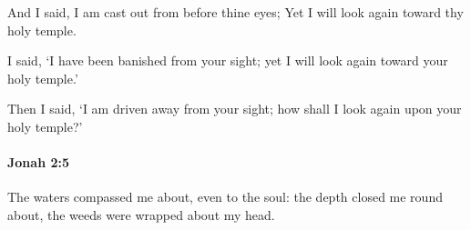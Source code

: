 			\begin{versebox}
					\item[BHS] 
					\item[LXX] 
					\item[ASV] And I said, I am cast out from before thine eyes; Yet I will look again toward thy holy temple.
					\item[NIV] I said, ‘I have been banished from your sight; yet I will look again toward your holy temple.’
					\item[NRSV] Then I said, ‘I am driven away from your sight; how shall I look again upon your holy temple?’
			\end{versebox}

		\paragraph{Jonah 2:5} %
			\label{JONAH-2-5}

			The waters compassed me about, even to the soul: the depth closed me round about, the weeds were wrapped about my head.

